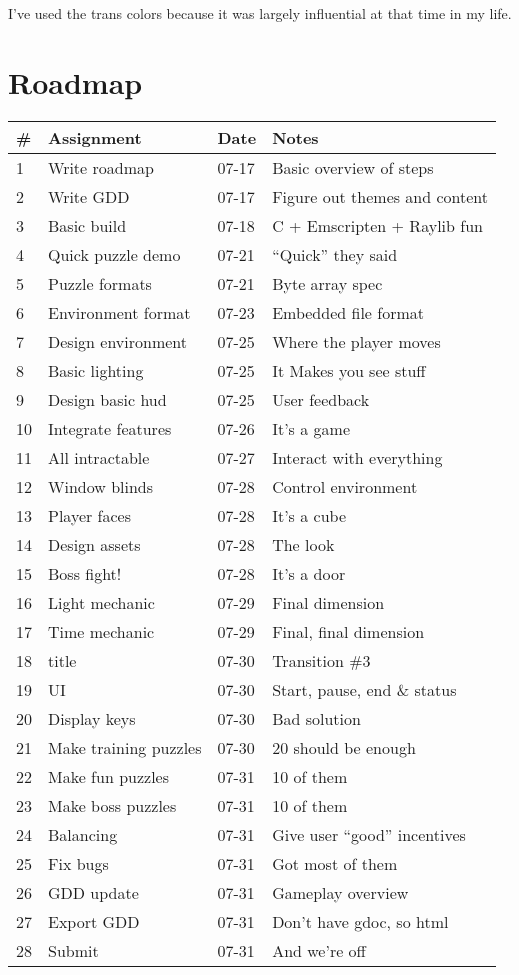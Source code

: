 \documentclass[12pt, letterpaper]{article}
\begin{document}
I've used the trans colors because it was largely influential at that time in
my life.

\section{Roadmap}

\bgroup
\def\arraystretch{1.5}
\begin{tabular}{ R{0.4cm} p{4cm} p{1.5cm} p{5.5cm} }
\toprule
{} & \textbf{Assignment} & \textbf{Date} & \textbf{Notes} \\ 
 & Write roadmap & 07-17 & Basic overview of steps \\
2 & Write GDD & 07-17 & Figure out themes and content \\
3 & Basic build & 07-18 & C + Emscripten + Raylib fun \\
4 & Quick puzzle demo & 07-21 & ``Quick'' they said \\
5 & Puzzle formats & 07-21 & Byte array spec \\
6 & Environment format & 07-23 & Embedded file format \\
7 & Design environment & 07-25 & Where the player moves \\
8 & Basic lighting & 07-25 & It Makes you see stuff \\
9 & Design basic hud & 07-25 & User feedback \\
10 & Integrate features & 07-26 & It's a game \\
11 & All intractable & 07-27 & Interact with everything \\
12 & Window blinds & 07-28 & Control environment \\
13 & Player faces & 07-28 & It's a cube \\
14 & Design assets & 07-28 & The look \\
15 & Boss fight! & 07-28 & It's a door \\
16 & Light mechanic & 07-29 & Final dimension \\
17 & Time mechanic & 07-29 & Final, final dimension \\
18 & title & 07-30 & Transition \#3 \\
19 & UI & 07-30 & Start, pause, end \& status \\
20 & Display keys & 07-30 & Bad solution \\
21 & Make training puzzles & 07-30 & 20 should be enough \\
22 & Make fun puzzles & 07-31 & 10 of them \\
23 & Make boss puzzles & 07-31 & 10 of them \\
24 & Balancing & 07-31 & Give user ``good'' incentives \\
25 & Fix bugs & 07-31 & Got most of them \\
26 & GDD update & 07-31 & Gameplay overview \\
27 & Export GDD & 07-31 & Don't have gdoc, so html \\
28 & Submit & 07-31 & And we're off \\

\bottomrule
\end{tabular}
\egroup
\end{document}
